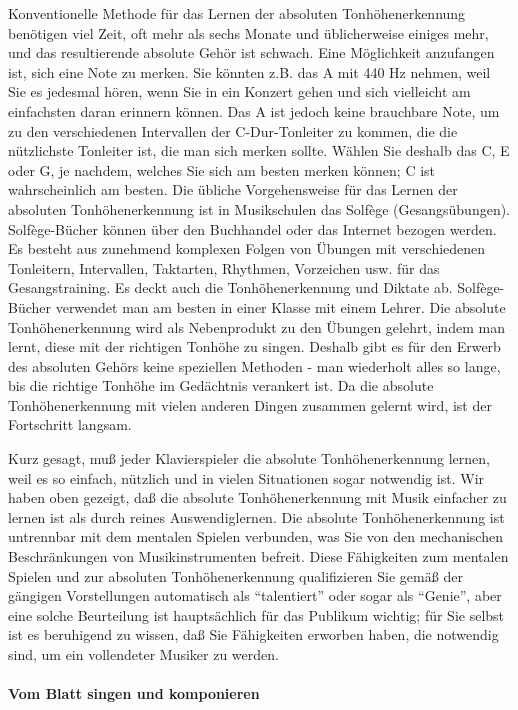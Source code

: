 Konventionelle Methode für das Lernen der absoluten Tonhöhenerkennung benötigen viel Zeit, oft mehr als sechs Monate und üblicherweise einiges mehr, und das resultierende absolute Gehör ist schwach.
Eine Möglichkeit anzufangen ist, sich eine Note zu merken.
Sie könnten z.B. das A mit 440 Hz nehmen, weil Sie es jedesmal hören, wenn Sie in ein Konzert gehen und sich vielleicht am einfachsten daran erinnern können.
Das A ist jedoch keine brauchbare Note, um zu den verschiedenen Intervallen der C-Dur-Tonleiter zu kommen, die die nützlichste Tonleiter ist, die man sich merken sollte.
Wählen Sie deshalb das C, E oder G, je nachdem, welches Sie sich am besten merken können; C ist wahrscheinlich am besten.
Die übliche Vorgehensweise für das Lernen der absoluten Tonhöhenerkennung ist in Musikschulen das Solfège (Gesangsübungen).
Solfège-Bücher können über den Buchhandel oder das Internet bezogen werden.
Es besteht aus zunehmend komplexen Folgen von Übungen mit verschiedenen Tonleitern, Intervallen, Taktarten, Rhythmen, Vorzeichen usw. für das Gesangstraining.
Es deckt auch die Tonhöhenerkennung und Diktate ab.
Solfège-Bücher verwendet man am besten in einer Klasse mit einem Lehrer.
Die absolute Tonhöhenerkennung wird als Nebenprodukt zu den Übungen gelehrt, indem man lernt, diese mit der richtigen Tonhöhe zu singen.
Deshalb gibt es für den Erwerb des absoluten Gehörs keine speziellen Methoden - man wiederholt alles so lange, bis die richtige Tonhöhe im Gedächtnis verankert ist.
Da die absolute Tonhöhenerkennung mit vielen anderen Dingen zusammen gelernt wird, ist der Fortschritt langsam.

Kurz gesagt, muß jeder Klavierspieler die absolute Tonhöhenerkennung lernen, weil es so einfach, nützlich und in vielen Situationen sogar notwendig ist.
Wir haben oben gezeigt, daß die absolute Tonhöhenerkennung mit Musik einfacher zu lernen ist als durch reines Auswendiglernen.
Die absolute Tonhöhenerkennung ist untrennbar mit dem mentalen Spielen verbunden, was Sie von den mechanischen Beschränkungen von Musikinstrumenten befreit.
Diese Fähigkeiten zum mentalen Spielen und zur absoluten Tonhöhenerkennung qualifizieren Sie gemäß der gängigen Vorstellungen automatisch als \enquote{talentiert} oder sogar als \enquote{Genie}, aber eine solche Beurteilung ist hauptsächlich für das Publikum wichtig; für Sie selbst ist es beruhigend zu wissen, daß Sie Fähigkeiten erworben haben, die notwendig sind, um ein vollendeter Musiker zu werden.


\paragraph{Vom Blatt singen und komponieren}
\label{c1iii12blatt}

